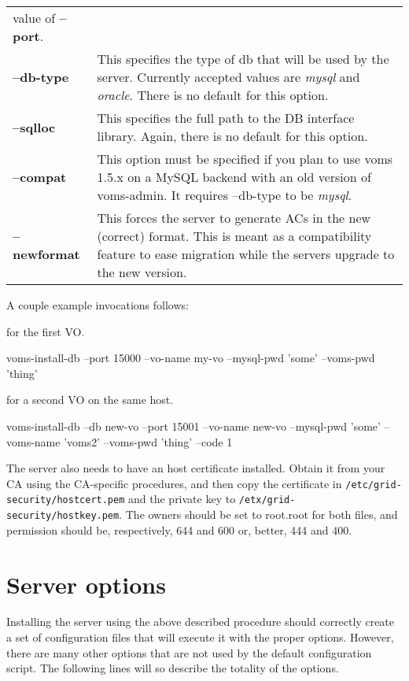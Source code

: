 \documentclass[a4paper]{book}
\begin{document}
\begin{longtable}{lp{3in}}
value of \textbf{--port}.\\
\textbf{--db-type} & This specifies the type of db that will be used by
the server.  Currently accepted values are \emph{mysql} and \emph{oracle}.
There is no default for this option.\\
\textbf{--sqlloc} & This specifies the full path to the DB interface library.
Again, there is no default for this option.\\
\textbf{--compat} & This option must be specified if you plan to use
voms 1.5.x on a MySQL backend with an old version of voms-admin.  It
requires --db-type to be \emph{mysql}.\\
\textbf{--newformat} & This forces the server to generate ACs in the new 
(correct) format.  This is meant as a compatibility feature to ease migration 
while the servers upgrade to the new version.\\
\end{longtable}

A couple example invocations follows:

for the first VO.

voms-install-db --port 15000 --vo-name my-vo --mysql-pwd 'some' --voms-pwd 'thing'

for a second VO on the same host.

voms-install-db --db new-vo --port 15001 --vo-name new-vo --mysql-pwd
'some' --voms-name 'voms2' --voms-pwd 'thing' --code 1

The server also needs to have an host certificate installed.  Obtain
it from your CA using the CA-specific procedures, and then copy the
certificate in \verb|/etc/grid-security/hostcert.pem| and the private
key to \verb|/etx/grid-security/hostkey.pem|.  The owners should be
set to root.root for both files, and permission should be,
respectively, 644 and 600 or, better, 444 and 400.

\section{Server options}
Installing the server using the above described procedure should
correctly create a set of configuration files that will execute it
with the proper options.  However, there are many other options that
are not used by the default configuration script.  The following lines
will so describe the totality of the options.
\end{document}
